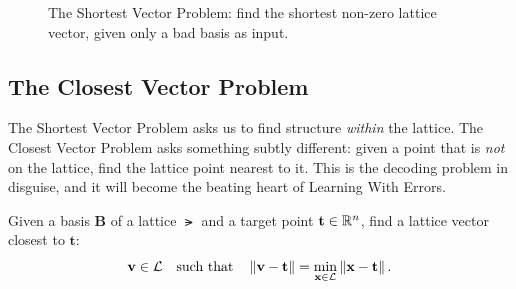 \begin{figure}[t]
\centering
{}
\caption{The Shortest Vector Problem: find the shortest non-zero lattice vector, given only a bad basis as input.}
\label{fig:ch06-svp}
\end{figure}


\subsection{The Closest Vector Problem}
\label{subsec:cvp}

The Shortest Vector Problem asks us to find structure \emph{within} the lattice.  The Closest Vector Problem asks something subtly different: given a point that is \emph{not} on the lattice, find the lattice point nearest to it.  This is the decoding problem in disguise, and it will become the beating heart of Learning With Errors.

\begin{definition}
\label{def:cvp}
Given a basis $\mathbf{B}$ of a lattice $\lat$ and a target point $\mathbf{t}\in\mathbb{R}^n$, find a lattice vector closest to $\mathbf{t}$:
\begin{equation}
\mathbf{v} \in \mathcal{L} \quad\text{such that}\quad \left\lVert \mathbf{v} - \mathbf{t} \right\rVert = \min_{\mathbf{x}\in\mathcal{L}}\left\lVert \mathbf{x} - \mathbf{t} \right\rVert.
\end{equation}
\end{definition}

